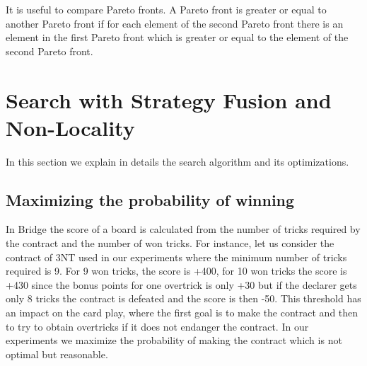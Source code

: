 \documentclass{ecai}
\begin{document}

It is useful to compare Pareto fronts. A Pareto front is greater or
equal to another Pareto front if for each element of the second Pareto
front there is an element in the first Pareto front which is greater
or equal to the element of the second Pareto front.



\section{Search with Strategy Fusion and Non-Locality}

In this section we explain in details the search algorithm and its
optimizations.

\subsection{Maximizing the probability of winning}

In Bridge the score of a board is calculated from the number of tricks
required by the contract and the number of won tricks. For instance,
let us consider the contract of 3NT used in our experiments where the
minimum number of tricks required is 9. For 9 won tricks, the score is
+400, for 10 won tricks the score is +430 since the bonus points for
one overtrick is only +30 but if the declarer gets only 8 tricks the
contract is defeated and the score is then -50. This threshold has an
impact on the card play, where the first goal is to make the contract
and then to try to obtain overtricks if it does not endanger the
contract. In our experiments we maximize the probability of making the
contract which is not optimal but reasonable.

\end{document}
